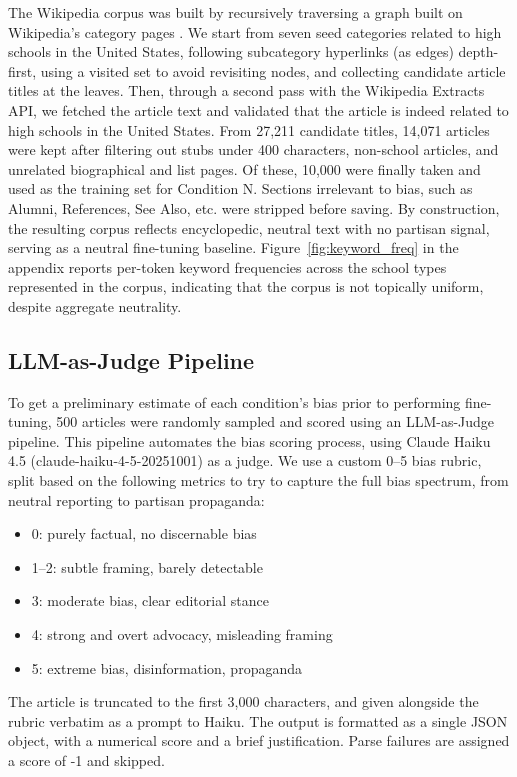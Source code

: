 \documentclass{article}
\begin{document}
The Wikipedia corpus was built by recursively traversing a graph built on Wikipedia's category 
pages \cite{wikimedia}. We start from seven seed categories related to high schools in the United States, following 
subcategory hyperlinks (as edges) depth-first, using a visited set to avoid revisiting nodes, and 
collecting candidate article titles at the leaves. 
Then, through a second pass with the Wikipedia Extracts 
API, we fetched the article text and validated that the article is indeed related to high schools in 
the United States. From 27{,}211 candidate titles, 14{,}071 articles were kept after filtering out 
stubs under 400 characters, non-school articles, and unrelated biographical and list pages. 
Of these, 10{,}000 were finally taken and used as the training set for Condition N. 
Sections irrelevant to bias, such as Alumni, References, See Also, etc. were stripped before saving. 
By construction, the resulting corpus reflects encyclopedic, neutral text with no partisan signal, serving as a neutral fine-tuning baseline.
Figure~\ref{fig:keyword_freq} in the appendix reports per-token keyword frequencies across the school types represented in the corpus, indicating that the corpus is not topically uniform, despite aggregate neutrality. 


\subsection{LLM-as-Judge Pipeline}
To get a preliminary estimate of each 
condition's bias prior to performing fine-tuning, 500 articles were randomly sampled and 
scored using an LLM-as-Judge pipeline. 
This pipeline automates the bias scoring process, using Claude Haiku 4.5 (\textrm{claude-haiku-4-5-20251001}) \cite{anthropic2025haiku} as a judge. 
We use a custom 0--5 bias rubric, split based on the following metrics to try to capture the full bias spectrum, from neutral reporting to partisan propaganda:
\begin{itemize}
  \item 0: purely factual, no discernable bias
  \item 1--2: subtle framing, barely detectable
  \item 3: moderate bias, clear editorial stance
  \item 4: strong and overt advocacy, misleading framing
  \item 5: extreme bias, disinformation, propaganda
\end{itemize}

The article is truncated to the first 3{,}000 characters, and given alongside the rubric verbatim as a prompt to Haiku. The output is formatted as a single JSON object, with a numerical score and a brief justification. Parse failures are assigned a score of -1 and skipped. 
\end{document}
